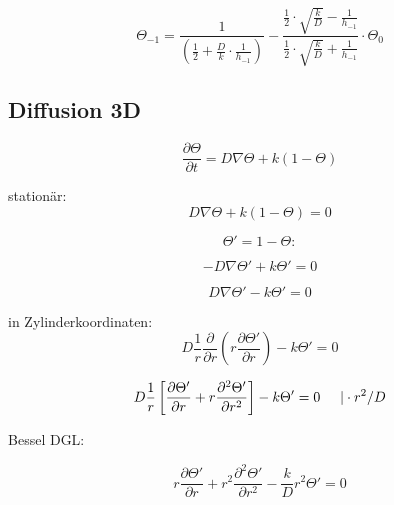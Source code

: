\begin{equation}
\Theta_{-1} = \frac{1}{(\frac{1}{2}+\frac{D}{k}\cdot \frac{1}{h_{-1}})} - \frac{\frac{1}{2}\cdot \sqrt{\frac{k}{D}} - \frac{1}{h_{-1}}}{\frac{1}{2}\cdot \sqrt{\frac{k}{D}} + \frac{1}{h_{-1}}}\cdot \Theta_0
\end{equation}

\subsection{Diffusion 3D}

\begin{equation}
\frac{\partial \Theta}{\partial t} = D\nabla\Theta + k(1-\Theta)
\end{equation}

station\"ar:\\

\begin{equation}
D\nabla\Theta + k(1-\Theta) = 0
\end{equation}

\begin{equation}
\Theta' = 1 - \Theta:
\end{equation}

\begin{equation}
-D\nabla\Theta' + k\Theta' = 0
\end{equation}

\begin{equation}
D\nabla\Theta' - k\Theta' = 0
\end{equation}

in Zylinderkoordinaten:\\

\begin{equation}
D\frac{1}{r}\frac{\partial}{\partial r}(r\frac{\partial \Theta'}{\partial r}) - k\Theta'  = 0
\end{equation}

\begin{equation}
D\frac{1}{r}\left[\frac{\partial\Theta'}{\partial r} + r\frac{\partial^2\Theta'}{\partial r^2}\right] - k\Theta' = 0 \hspace{0.5cm} |\cdot r^2/D
\end{equation}

Bessel DGL:

\begin{equation}
r\frac{\partial\Theta'}{\partial r} + r^2\frac{\partial^2\Theta'}{\partial r^2} - \frac{k}{D}r^2\Theta' = 0
\end{equation}

